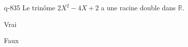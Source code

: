\begin{truefalse}{q-835}
Le trinôme $2X^2-4X+2$ a une racine double dans $\mathbb R$.
\item* Vrai
\item Faux
\end{truefalse}


